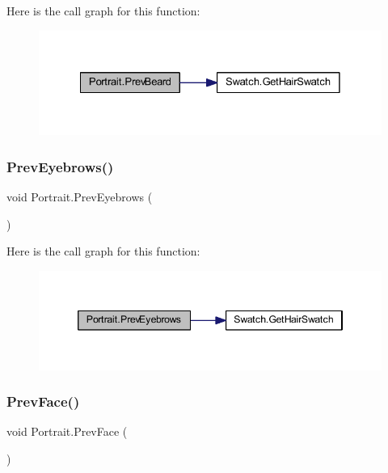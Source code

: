 Here is the call graph for this function\+:\nopagebreak
\begin{figure}[H]
\begin{center}
\leavevmode
\includegraphics[width=328pt]{class_portrait_ada91686eb3d44e5771a81dc147462258_cgraph}
\end{center}
\end{figure}
\mbox{\label{class_portrait_abce38ec7263bad9ae029b40e585fe6b1}} 
\subsubsection{\texorpdfstring{PrevEyebrows()}{PrevEyebrows()}}
{\footnotesize\ttfamily void Portrait.\+Prev\+Eyebrows (\begin{DoxyParamCaption}{ }\end{DoxyParamCaption})}

Here is the call graph for this function\+:\nopagebreak
\begin{figure}[H]
\begin{center}
\leavevmode
\includegraphics[width=346pt]{class_portrait_abce38ec7263bad9ae029b40e585fe6b1_cgraph}
\end{center}
\end{figure}
\mbox{\label{class_portrait_aa550ccd7202589090d88e812743da74a}} 
\subsubsection{\texorpdfstring{PrevFace()}{PrevFace()}}
{\footnotesize\ttfamily void Portrait.\+Prev\+Face (\begin{DoxyParamCaption}{ }\end{DoxyParamCaption})}

